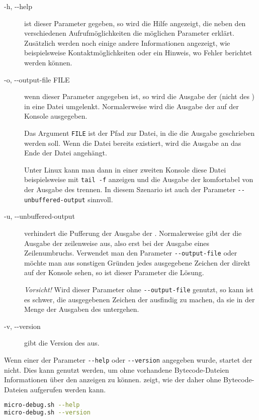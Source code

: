 \begin{description}
\item[-h, -{}-help]
  ist dieser Parameter gegeben, so wird die Hilfe angezeigt, die neben den verschiedenen Aufrufmöglichkeiten die möglichen Parameter erklärt. Zusätzlich werden noch einige andere Informationen angezeigt, wie beispielsweise Kontaktmöglichkeiten oder ein Hinweis, wo Fehler berichtet werden können.

\item[-o, -{}-output-file FILE]
  wenn dieser Parameter angegeben ist, so wird die Ausgabe der \mic (nicht des \md) in eine Datei umgelenkt. Normalerweise wird die Ausgabe der \mic auf der Konsole ausgegeben.

  Das Argument \texttt{FILE} ist der Pfad zur Datei, in die die Ausgabe geschrieben werden soll. Wenn die Datei bereits existiert, wird die Ausgabe an das Ende der Datei angehängt.

  Unter Linux kann man dann in einer zweiten Konsole diese Datei beispielsweise mit \texttt{tail~-f} anzeigen und die Ausgabe der \mic komfortabel von der Ausgabe des \md trennen. In diesem Szenario ist auch der Parameter \texttt{-{}-unbuffered-output} sinnvoll.

\item[-u, -{}-unbuffered-output]
  verhindert die Pufferung der Ausgabe der \mic. Normalerweise gibt der \md die Ausgabe der \mic zeilenweise aus, also erst bei der Ausgabe eines Zeilenumbruchs. Verwendet man den Parameter \texttt{-{}-output-file} oder möchte man aus sonstigen Gründen jedes ausgegebene Zeichen der \mic direkt auf der Konsole sehen, so ist dieser Parameter die Lösung.

  \emph{Vorsicht!} Wird dieser Parameter ohne \texttt{-{}-output-file} genutzt, so kann ist es schwer, die ausgegebenen Zeichen der \mic ausfindig zu machen, da sie in der Menge der Ausgaben des \md untergehen.

\item[-v, -{}-version]
  gibt die Version des \md aus.
\end{description}

Wenn einer der Parameter \texttt{-{}-help} oder \texttt{-{}-version} angegeben wurde, startet der \md nicht. Dies kann genutzt werden, um ohne vorhandene Bytecode-Dateien Informationen über den \md anzeigen zu können.  zeigt, wie der \md daher ohne Bytecode-Dateien aufgerufen werden kann.

\begin{lstlisting}[language=sh,caption={Aufruf des \md ohne Start},label=\lstlbl{aufrufe-ohne-start}]
micro-debug.sh --help
micro-debug.sh --version
\end{lstlisting}

